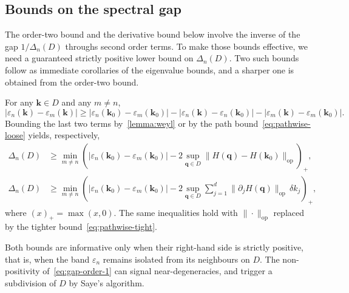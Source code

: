 \documentclass[11pt]{article}
\numberwithin{equation}{section}
\begin{document}
\subsection{Bounds on the spectral gap}\label{sec:bounds-gap}

The order-two bound and the derivative bound below involve the inverse of the gap
\(1/\Delta_n(D)\) throughs second order terms. To make those bounds effective, we need a
guaranteed strictly positive lower bound on \(\Delta_n(D)\). Two such bounds follow as
immediate corollaries of the eigenvalue bounds, and a sharper one is obtained from the
order-two bound.

\begin{corollary}\label{cor:gap-bounds}
    For any \(\mathbf{k} \in D\) and any \(m \neq n\),
    \begin{equation}
        |\varepsilon_n(\mathbf{k}) - \varepsilon_m(\mathbf{k})|
        \geq |\varepsilon_n(\mathbf{k}_0) - \varepsilon_m(\mathbf{k}_0)|
        - |\varepsilon_n(\mathbf{k}) - \varepsilon_n(\mathbf{k}_0)|
        - |\varepsilon_m(\mathbf{k}) - \varepsilon_m(\mathbf{k}_0)|.
        \label{eq:gap-triangle}
    \end{equation}
    Bounding the last two terms by~\autoref{lemma:weyl} or by the path
    bound~\eqref{eq:pathwise-loose} yields, respectively,
    \begin{align}
        \Delta_n(D)
         & \geq \min_{m \neq n}
        \left( |\varepsilon_n(\mathbf{k}_0) - \varepsilon_m(\mathbf{k}_0)|
        - 2 \sup_{\mathbf{q} \in D}
        \|H(\mathbf{q}) - H(\mathbf{k}_0)\|_\mathrm{op} \right)_+,
        \label{eq:gap-order-0}  \\[4pt]
        \Delta_n(D)
         & \geq \min_{m \neq n}
        \left( |\varepsilon_n(\mathbf{k}_0) - \varepsilon_m(\mathbf{k}_0)|
        - 2 \sup_{\mathbf{q} \in D}
        \sum_{j=1}^d \|\partial_j H(\mathbf{q})\|_\mathrm{op}\,
        \delta k_j \right)_+,
        \label{eq:gap-order-1}
    \end{align}
    where \((x)_+ = \max(x, 0)\). The same inequalities hold with
    \(\|\cdot\|_\mathrm{op}\) replaced by the tighter
    bound~\eqref{eq:pathwise-tight}.
\end{corollary}

\begin{remark}
    Both bounds are informative only when their right-hand side is strictly positive, that
    is, when the band \(\varepsilon_n\) remains isolated from its neighbours on \(D\). The
    non-positivity of~\eqref{eq:gap-order-1} can signal near-degeneracies, and trigger a
    subdivision of \(D\) by Saye's algorithm.
\end{remark}
\end{document}
